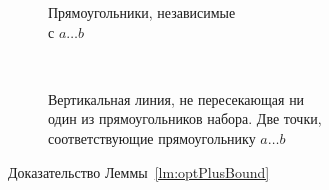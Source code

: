\begin{figure} \centering
\begin{subfigure}[m]{0.42\textwidth} \centering
\caption{Прямоугольники, независимые \\ с $a \ldots b$}
\label{fig:rectCases}
\end{subfigure}\ \ \ 
\begin{subfigure}[m]{0.5\textwidth} \centering
\caption{Вертикальная линия, не пересекающая ни \\
	один из прямоугольников набора. Две точки, \\
	соответствующие прямоугольнику $a \ldots b$}
\label{fig:rectPQ}
\end{subfigure}
     \caption{Доказательство Леммы~\ref{lm:optPlusBound}}
\end{figure}
